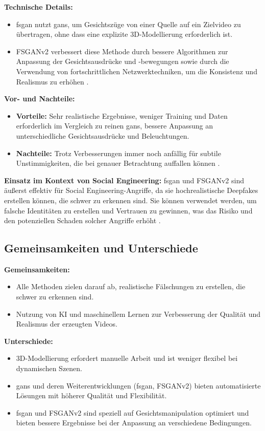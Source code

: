 \textbf{Technische Details:}
\begin{itemize}
    \item \gls{fsgan} nutzt \glspl{gan}, um Gesichtszüge von einer Quelle auf ein Zielvideo zu übertragen, ohne dass eine explizite 3D-Modellierung erforderlich ist.
    \item FSGANv2 verbessert diese Methode durch bessere Algorithmen zur Anpassung der Gesichtsausdrücke und -bewegungen sowie durch die Verwendung von fortschrittlichen Netzwerktechniken, um die Konsistenz und Realismus zu erhöhen \cite{fsganv2}.
\end{itemize}

\textbf{Vor- und Nachteile:}
\begin{itemize}
    \item \textbf{Vorteile:} Sehr realistische Ergebnisse, weniger Training und Daten erforderlich im Vergleich zu reinen \glspl{gan}, bessere Anpassung an unterschiedliche Gesichtsausdrücke und Beleuchtungen.
    \item \textbf{Nachteile:} Trotz Verbesserungen immer noch anfällig für subtile Unstimmigkeiten, die bei genauer Betrachtung auffallen können \cite{face-swapping-and-reenactment}.
\end{itemize}

\textbf{Einsatz im Kontext von Social Engineering:} \gls{fsgan} und FSGANv2 sind äußerst effektiv für Social Engineering-Angriffe, da sie hochrealistische Deepfakes erstellen können, die schwer zu erkennen sind.
Sie können verwendet werden, um falsche Identitäten zu erstellen und Vertrauen zu gewinnen, was das Risiko und den potenziellen Schaden solcher Angriffe erhöht \cite{deepfacelab}.

\subsection{Gemeinsamkeiten und Unterschiede}\label{subsec:gemeinsamkeiten-unterschiede}

\textbf{Gemeinsamkeiten:}
\begin{itemize}
    \item Alle Methoden zielen darauf ab, realistische Fälschungen zu erstellen, die schwer zu erkennen sind.
    \item Nutzung von KI und maschinellem Lernen zur Verbesserung der Qualität und Realismus der erzeugten Videos.
\end{itemize}

\textbf{Unterschiede:}
\begin{itemize}
    \item 3D-Modellierung erfordert manuelle Arbeit und ist weniger flexibel bei dynamischen Szenen.
    \item \glspl{gan} und deren Weiterentwicklungen (\gls{fsgan}, FSGANv2) bieten automatisierte Lösungen mit höherer Qualität und Flexibilität.
    \item \gls{fsgan} und FSGANv2 sind speziell auf Gesichtsmanipulation optimiert und bieten bessere Ergebnisse bei der Anpassung an verschiedene Bedingungen\cite{Deepfakes-a-survey-and-introduction-to-the-topical-collection}.
\end{itemize}

